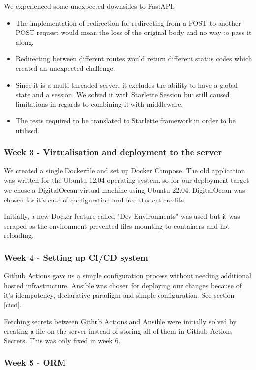 \documentclass{article}
\begin{document}
We experienced some unexpected downsides to FastAPI:
\begin{itemize}
    \item The implementation of redirection for redirecting from a POST to another POST request would mean the loss of the original body and no way to pass it along. 
    \item Redirecting between different routes would return different status codes which created an unexpected challenge.
    \item Since it is a multi-threaded server, it excludes the ability to have a global state and a session. We solved it with Starlette Session but still caused limitations in regards to combining it with middleware.
    \item The tests required to be translated to Starlette framework in order to be utilised.
\end{itemize}

\subsubsection{Week 3 - Virtualisation and deployment to the server}

We created a single Dockerfile and set up Docker Compose. The old application was written for the Ubuntu 12.04 operating system, so for our deployment target we chose a DigitalOcean virtual machine using Ubuntu 22.04. DigitalOcean was chosen for it's ease of configuration and free student credits.

Initially, a new Docker feature called "Dev Environments" was used but it was  scraped as the environment prevented files mounting to containers and hot reloading.


\subsubsection{Week 4 - Setting up CI/CD system }

Github Actions gave us a simple configuration process without needing additional hosted infrastructure. Ansible was chosen for deploying our changes because of it's idempotency, declarative paradigm and simple configuration.
See section \ref{cicd}. 

Fetching secrets between Github Actions and Ansible were initially solved by creating a file on the server instead of storing all of them in Github Actions Secrets. This was only fixed in week 6.

\subsubsection{Week 5 - ORM }
\end{document}
